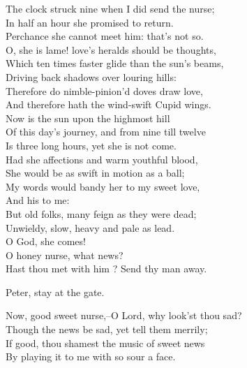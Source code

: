  
\begin{speech}
The clock struck nine when I did send the nurse; \\

In half an hour she promised to return. \\
Perchance she cannot meet him: that's not so. \\
O, she is lame! love's heralds should be thoughts, \\
Which ten times faster glide than the sun's beams, \\
Driving back shadows over louring hills: \\
Therefore do nimble-pinion'd doves draw love, \\
And   therefore hath the wind-swift Cupid wings. \\
Now is the sun upon the highmost hill \\
Of this day's journey, and from nine till twelve \\
Is three long hours, yet she is not come. \\
Had she affections and warm youthful blood, \\
She would be as swift in motion as a ball; \\
My words would bandy her to my sweet love, \\
And his to me: \\
But old folks, many feign as they were dead; \\
Unwieldy, slow, heavy and pale as lead. \\
O God, she comes!  \\
O honey nurse, what news? \\
Hast thou met with him ?   Send thy man away. \\
\end{speech}
\begin{speech}
Peter, stay at the gate. 
\\
\end{speech}
\begin{speech}
Now, good sweet nurse,--O Lord, why look'st thou sad?
\\
Though the news be sad, yet tell them merrily; \\
If good, thou shamest the music of sweet news \\
By playing it to me with so sour a face. \\
\end{speech}
